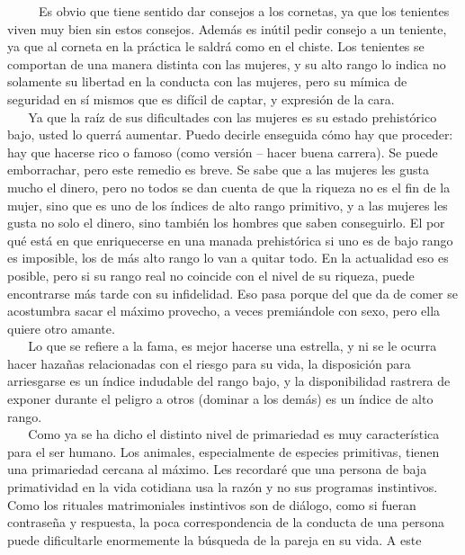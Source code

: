 ~ ~ ~ Es obvio que tiene sentido dar consejos a los cornetas, ya que los
tenientes viven muy bien sin estos consejos. Además es inútil pedir
consejo a un teniente, ya que al corneta en la práctica le saldrá como
en el chiste. Los tenientes se comportan de una manera distinta con las
mujeres, y su alto rango lo indica no solamente su libertad en la
conducta con las mujeres, pero su mímica de seguridad en sí mismos que
es difícil de captar, y expresión de la cara.\\
\hspace*{0.333em} ~ ~ Ya que la raíz de sus dificultades con las mujeres
es su estado prehistórico bajo, usted lo querrá aumentar. Puedo decirle
enseguida cómo hay que proceder: hay que hacerse rico o famoso (como
versión -- hacer buena carrera). Se puede emborrachar, pero este remedio
es breve. Se sabe que a las mujeres les gusta mucho el dinero, pero no
todos se dan cuenta de que la riqueza no es el fin de la mujer, sino que
es uno de los índices de alto rango primitivo, y a las mujeres les gusta
no solo el dinero, sino también los hombres que saben conseguirlo. El
por qué está en que enriquecerse en una manada prehistórica si uno es de
bajo rango es imposible, los de más alto rango lo van a quitar todo. En
la actualidad eso es posible, pero si su rango real no coincide con el
nivel de su riqueza, puede encontrarse más tarde con su infidelidad. Eso
pasa porque del que da de comer se acostumbra sacar el máximo provecho,
a veces premiándole con sexo, pero ella quiere otro amante.\\
\hspace*{0.333em} ~ ~ Lo que se refiere a la fama, es mejor hacerse una
estrella, y ni se le ocurra hacer hazañas relacionadas con el riesgo
para su vida, la disposición para arriesgarse es un índice indudable del
rango bajo, y la disponibilidad rastrera de exponer durante el peligro a
otros (dominar a los demás) es un índice de alto rango.\\
\hspace*{0.333em} ~ ~ Como ya se ha dicho el distinto nivel de
primariedad es muy característica para el ser humano. Los animales,
especialmente de especies primitivas, tienen una primariedad cercana al
máximo. Les recordaré que una persona de baja primatividad en la vida
cotidiana usa la razón y no sus programas instintivos. Como los rituales
matrimoniales instintivos son de diálogo, como si fueran contraseña y
respuesta, la poca correspondencia de la conducta de una persona puede
dificultarle enormemente la búsqueda de la pareja en su vida. A este
